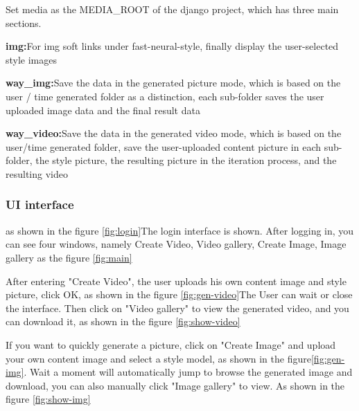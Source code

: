 Set media as the MEDIA\_ROOT of the django project, which has three main sections.
\begin{description}
  \item{\textbf{img:}}For img soft links under fast-neural-style, finally display the user-selected style images
  \item{\textbf{way\_img:}}Save the data in the generated picture mode, which is based on the user / time generated folder as a distinction, each sub-folder saves the user uploaded image data and the final result data
  \item{\textbf{way\_video:}}Save the data in the generated video mode, which is based on the user/time generated folder, save the user-uploaded content picture in each sub-folder, the style picture, the resulting picture in the iteration process, and the resulting video
\end{description}

\subsubsection{UI interface}
as shown in the figure \ref{fig:login}The login interface is shown. After logging in, you can see four windows, namely Create Video, Video gallery, Create Image, Image gallery as the figure \ref{fig:main}

After entering "Create Video", the user uploads his own content image and style picture, click OK, as shown in the figure \ref{fig:gen-video}The User can wait or close the interface.
Then click on "Video gallery" to view the generated video, and you can download it, as shown in the figure \ref{fig:show-video}

If you want to quickly generate a picture, click on "Create Image" and upload your own content image and select a style model, as shown in the figure\ref{fig:gen-img}.
Wait a moment will automatically jump to browse the generated image and download, you can also manually click "Image gallery" to view. As shown in the figure \ref{fig:show-img}
